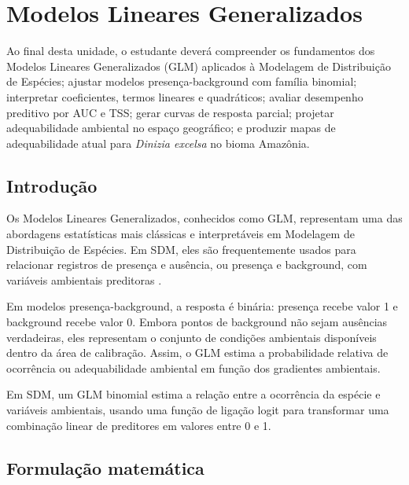 \documentclass{ueap-sdm}
\begin{document}

\chapter[GLM]{Modelos Lineares Generalizados}

\begin{objetivos}
	Ao final desta unidade, o estudante deverá compreender os fundamentos dos Modelos Lineares Generalizados (GLM) aplicados à Modelagem de Distribuição de Espécies; ajustar modelos presença-background com família binomial; interpretar coeficientes, termos lineares e quadráticos; avaliar desempenho preditivo por AUC e TSS; gerar curvas de resposta parcial; projetar adequabilidade ambiental no espaço geográfico; e produzir mapas de adequabilidade atual para \textit{Dinizia excelsa} no bioma Amazônia.
\end{objetivos}

\section{Introdução}

Os Modelos Lineares Generalizados, conhecidos como GLM, representam uma das abordagens estatísticas mais clássicas e interpretáveis em Modelagem de Distribuição de Espécies. Em SDM, eles são frequentemente usados para relacionar registros de presença e ausência, ou presença e background, com variáveis ambientais preditoras \parencite{guisan2000,guisan2005predicting,guisan2017habitat}.

Em modelos presença-background, a resposta é binária: presença recebe valor 1 e background recebe valor 0. Embora pontos de background não sejam ausências verdadeiras, eles representam o conjunto de condições ambientais disponíveis dentro da área de calibração. Assim, o GLM estima a probabilidade relativa de ocorrência ou adequabilidade ambiental em função dos gradientes ambientais.

\begin{conceito}[title={\faBook\quad GLM em SDM}]
	Em SDM, um GLM binomial estima a relação entre a ocorrência da espécie e variáveis ambientais, usando uma função de ligação logit para transformar uma combinação linear de preditores em valores entre 0 e 1.
\end{conceito}

\section{Formulação matemática}
\end{document}
